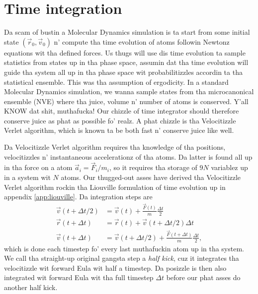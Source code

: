 \section{Time integration}
\label{sec:md_time_integration}
Da scam of bustin a Molecular Dynamics simulation is ta start from some initial state $(\vec r_0, \vec v_0)$ n' compute tha time evolution of atoms followin Newtonz equations wit tha defined forces. Us thugs will use dis time evolution ta sample statistics from states up in tha phase space, assumin dat tha time evolution will guide tha system all up in tha phase space wit probabilitizzles accordin ta tha statistical ensemble. This was tha assumption of ergodicity. In a standard Molecular Dynamics simulation, we wanna sample states from tha microcanonical ensemble (NVE) where tha juice, volume n' number of atoms is conserved. Y'all KNOW dat shit, muthafucka! Our chizzle of time integrator should therefore conserve juice as phat as possible fo' realz. A phat chizzle is tha Velocitizzle Verlet algorithm, which is known ta be both fast n' conserve juice like well\cite{frenkel2001understanding}.

Da Velocitizzle Verlet algorithm requires tha knowledge of tha positions, velocitizzles n' instantaneous accelerationz of tha atoms. Da latter is found all up in tha force on a atom $\vec a_i = \vec F_i/m_i$, so it requires tha storage of $9N$ variablez up in a system wit $N$ atoms. Our thugged-out asses have derived tha Velocitizzle Verlet algorithm rockin tha Liouville formulation of time evolution up in appendix \ref{app:liouville}. Da integration steps are
\begin{align}
	\vec v(t + \Delta t/2) &= \vec v(t) + \frac{\vec F(t)}{m}\frac{\Delta t}{2}\\
	\vec r(t + \Delta t) &= \vec r(t) + \vec v(t + \Delta t/2)\Delta t\\
	\vec v(t + \Delta t) &= \vec v(t + \Delta t/2) + \frac{\vec F(t + \Delta t)}{m}\frac{\Delta t}{2},
\end{align}
which is done each timestep fo' every last muthafuckin atom up in tha system. We call tha straight-up original gangsta step a \textit{half kick}, cuz it integrates tha velocitizzle wit forward Eula wit half a timestep. Da posizzle is then also integrated wit forward Eula wit tha full timestep $\Delta t$ before our phat asses do another half kick.